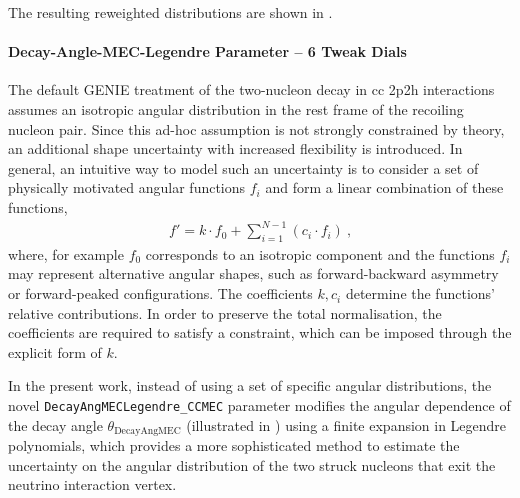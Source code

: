The resulting reweighted distributions are shown in .

\paragraph{Decay-Angle-MEC-Legendre Parameter – 6 Tweak Dials}
The default GENIE treatment of the two-nucleon decay in \acrshort{cc} \acrshort{2p2h} interactions assumes an isotropic angular distribution in the rest frame of the recoiling nucleon pair.
Since this ad-hoc assumption is not strongly constrained by theory, an additional shape uncertainty with increased flexibility is introduced. In general, an intuitive way to model such an uncertainty is to consider a set of physically motivated angular functions $f_i$ and form a linear combination of these functions,
%
\begin{align} \label{eq:func_linear_combination}
    f' = k \cdot f_0 + \sum^{N-1}_{i=1} (c_i \cdot f_i) \ \text{,}
\end{align}
%
where, for example $f_0$ corresponds to an isotropic component and the functions $f_i$ may represent alternative angular shapes, such as  forward-backward asymmetry or forward-peaked configurations. The coefficients $k, c_i$ determine the functions' relative contributions. In order to preserve the total normalisation, the coefficients are required to satisfy a constraint, which can be imposed through the explicit form of $k$.

In the present work, instead of using a set of specific angular distributions, the novel \verb!DecayAngMECLegendre_CCMEC! parameter modifies the angular dependence of the decay angle $\theta_\text{DecayAngMEC}$ (illustrated in ) using a finite expansion in Legendre polynomials, which provides a more sophisticated method to estimate the uncertainty on the angular distribution of the two struck nucleons that exit the neutrino interaction vertex.

